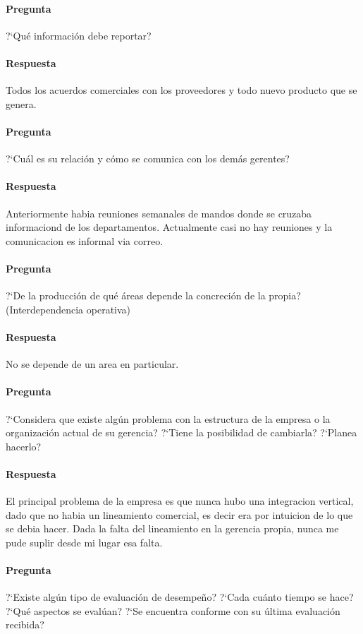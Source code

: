 \documentclass[12pt,a4paper,spanish]{article}
\begin{document}
	\paragraph{Pregunta}
	 ?`Qu\'e informaci\'on debe reportar?
	\paragraph{Respuesta}
Todos los acuerdos comerciales con los proveedores y todo nuevo producto que se genera.

	\paragraph{Pregunta}
	 ?`Cu\'al es su relaci\'on y c\'omo se comunica con los dem\'as gerentes?
	\paragraph{Respuesta}
Anteriormente habia reuniones semanales de mandos donde se cruzaba informaciond de los departamentos. Actualmente casi no hay reuniones y la comunicacion es informal via correo.

	\paragraph{Pregunta}
	 ?`De la producci\'on de qu\'e \'areas depende la concreci\'on de la propia? (Interdependencia operativa)
	\paragraph{Respuesta}
No se depende de un area en particular.
	\paragraph{Pregunta}
	 ?`Considera que existe alg\'un problema con la estructura de la empresa o la organizaci\'on actual de su gerencia?  ?`Tiene la posibilidad de cambiarla?  ?`Planea hacerlo?
	\paragraph{Respuesta}
El principal problema de la empresa es que nunca hubo una integracion vertical, dado que no habia un lineamiento comercial, es decir era por intuicion de lo que se debia hacer.
Dada la falta del lineamiento en la gerencia propia, nunca me pude suplir desde mi lugar esa falta.

	\paragraph{Pregunta}
	 ?`Existe alg\'un tipo de evaluaci\'on de desempe\~{n}o?  ?`Cada cu\'anto tiempo se hace?  ?`Qu\'e aspectos se eval\'uan?  ?`Se encuentra conforme con su \'ultima evaluaci\'on recibida?
\end{document}
